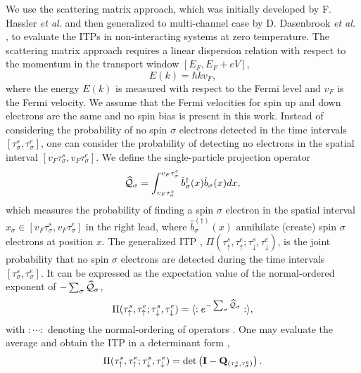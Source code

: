 \documentclass[aps,prb,twocolumn,footinbib,showpacs,superscriptaddress,preprintnumbers,amsmath,amssymb]{revtex4-1}
\begin{document}
	We use the scattering matrix approach, which was initially developed by F. Hassler {\it et al.} \cite{wavepacket} and then generalized to multi-channel case by D. Dasenbrook {\it et al.} \cite{WTD_correlated}, to evaluate the ITPs in non-interacting systems at zero temperature. The scattering matrix approach requires a linear dispersion relation with respect to the momentum in the transport window $[E_F, E_F+eV]$,
\begin{equation}
E(k) = \hbar k v_F ,
\end{equation}
where the energy $E(k)$ is measured with respect to the Fermi level and $v_F$ is the Fermi velocity. We assume that the Fermi velocities for spin up and down electrons are the same and no spin bias is present in this work. 
Instead of considering the probability of no spin $\sigma$ electrons detected in the time intervals $[\tau_\sigma^s, \tau_\sigma^e]$, one can consider the probability of detecting no electrons in the spatial interval $[v_F\tau_\sigma^s, v_F\tau_\sigma^e]$. 
We define the single-particle projection operator
\begin{equation}
\widehat{{\cal Q}}_\sigma = \int_{v_F\tau_\sigma^s}^{v_F\tau_\sigma^e} \hat{b}_\sigma^\dag (x) \hat{b}_\sigma(x) dx ,
\end{equation}
which measures the probability of finding a spin $\sigma$ electron in the spatial interval $x_\sigma \in [v_F \tau_\sigma^s, v_F \tau_\sigma^e]$ in the right lead, where $\hat{b}_\sigma^{(\dag)} (x)$  annihilate (create) spin $\sigma$ electrons at position $x$.
The generalized ITP \cite{WTD_correlated}, $\Pi(\tau_\uparrow^s, \tau_\uparrow^e; \tau_\downarrow^s, \tau_\downarrow^e)$, is the joint probability that no spin $\sigma$ electrons are detected during the time intervals $[\tau_\sigma^s, \tau_\sigma^e]$.
It can be expressed as the expectation value of the normal-ordered exponent of $-\sum_\sigma \widehat{{\cal Q}}_\sigma$,
\begin{equation}
\Pi(\tau_\uparrow^s, \tau_\uparrow^e; \tau_\downarrow^s, \tau_\downarrow^e) = \langle : e^{-\sum_\sigma \widehat{{\cal Q}}_\sigma} : \rangle ,
\end{equation}
with $:\cdots:$ denoting the normal-ordering of operators \cite{WTD_correlated}. One may evaluate the average and obtain the ITP in a determinant form \cite{WTD_correlated},
\begin{equation} \label{ITP}
\Pi(\tau_\uparrow^s, \tau_\uparrow^e; \tau_\downarrow^s, \tau_\downarrow^e) = \det\left( {\bf I} -{\bf Q}_{(\tau_\sigma^s, \tau_\sigma^e)} \right) .
\end{equation}
\end{document}
